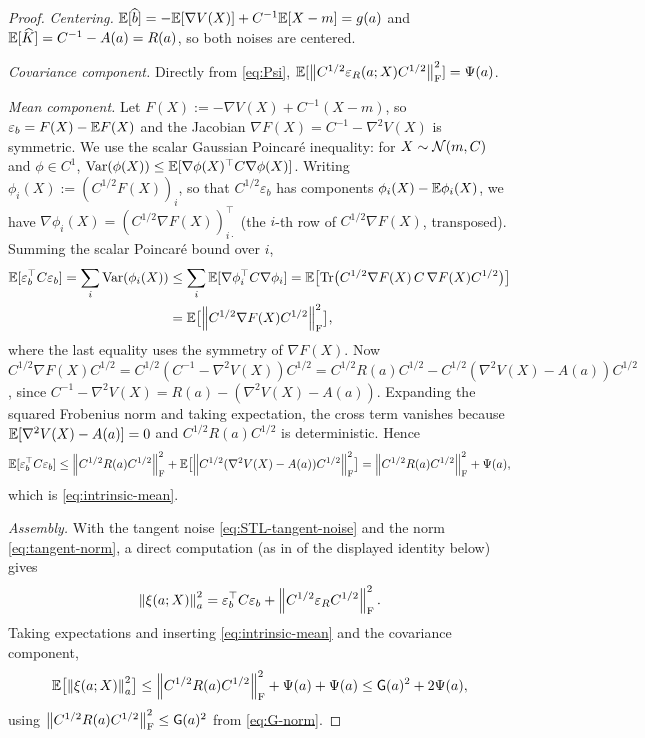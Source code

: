 \begin{proof}
\emph{Centering.} $\mathbb{E}[\widehat b]=-\mathbb{E}[\nabla V(X)]+C^{-1}\mathbb{E}[X-m]=g(a)$ and
$\mathbb{E}[\widehat K]=C^{-1}-A(a)=R(a)$, so both noises are centered.

\emph{Covariance component.} Directly from \eqref{eq:Psi},
$\mathbb{E}[\left\lVert C^{1/2}\varepsilon_R(a;X)C^{1/2}\right\rVert_{\mathrm{F}}^2]=\Psi(a)$.

\emph{Mean component.} Let $F(X):=-\nabla V(X)+C^{-1}(X-m)$, so
$\varepsilon_b=F(X)-\mathbb{E} F(X)$ and the Jacobian $\nabla F(X)=C^{-1}-\nabla^2V(X)$ is symmetric.
We use the scalar Gaussian Poincar\'e inequality: for $X\sim\mathcal{N}(m,C)$ and $\phi\in C^1$,
$\operatorname{Var}(\phi(X))\leq\mathbb{E}[\nabla\phi(X)^\top C\nabla\phi(X)]$. Writing
$\phi_i(X):=(C^{1/2}F(X))_i$, so that $C^{1/2}\varepsilon_b$ has components
$\phi_i(X)-\mathbb{E}\phi_i(X)$, we have $\nabla\phi_i(X)=(C^{1/2}\nabla F(X))_{i\cdot}^\top$ (the
$i$-th row of $C^{1/2}\nabla F(X)$, transposed). Summing the scalar Poincar\'e bound over
$i$,
\begin{align*}
    \mathbb{E}[\varepsilon_b^\top C\varepsilon_b]
    =
    \sum_i\operatorname{Var}(\phi_i(X))
    &\leq
    \sum_i\mathbb{E}[\nabla\phi_i^\top C\nabla\phi_i]
    =
    \mathbb{E}\bigl[\operatorname{Tr}\bigl(C^{1/2}\nabla F(X)\,C\,\nabla F(X)C^{1/2}\bigr)\bigr]\\
    &=
    \mathbb{E}\bigl[\left\lVert C^{1/2}\nabla F(X)C^{1/2}\right\rVert_{\mathrm{F}}^2\bigr],
\end{align*}
where the last equality uses the symmetry of $\nabla F(X)$. Now
$C^{1/2}\nabla F(X)C^{1/2}=C^{1/2}(C^{-1}-\nabla^2V(X))C^{1/2}=C^{1/2}R(a)C^{1/2}-C^{1/2}(\nabla^2V(X)-A(a))C^{1/2}$,
since $C^{-1}-\nabla^2V(X)=R(a)-(\nabla^2V(X)-A(a))$. Expanding the squared Frobenius
norm and taking expectation, the cross term vanishes because
$\mathbb{E}[\nabla^2V(X)-A(a)]=0$ and $C^{1/2}R(a)C^{1/2}$ is deterministic. Hence
\[
    \mathbb{E}[\varepsilon_b^\top C\varepsilon_b]
    \leq
    \left\lVert C^{1/2}R(a)C^{1/2}\right\rVert_{\mathrm{F}}^2
    +
    \mathbb{E}\bigl[\left\lVert C^{1/2}(\nabla^2V(X)-A(a))C^{1/2}\right\rVert_{\mathrm{F}}^2\bigr]
    =
    \left\lVert C^{1/2}R(a)C^{1/2}\right\rVert_{\mathrm{F}}^2+\Psi(a),
\]
which is \eqref{eq:intrinsic-mean}.

\emph{Assembly.} With the tangent noise \eqref{eq:STL-tangent-noise} and the norm
\eqref{eq:tangent-norm}, a direct computation (as in  of the
displayed identity below) gives
\[
    \left\lVert \xi(a;X)\right\rVert_a^2
    =
    \varepsilon_b^\top C\varepsilon_b
    +
    \left\lVert C^{1/2}\varepsilon_R C^{1/2}\right\rVert_{\mathrm{F}}^2 .
\]
Taking expectations and inserting \eqref{eq:intrinsic-mean} and the covariance component,
\[
    \mathbb{E}\bigl[\left\lVert \xi(a;X)\right\rVert_a^2\bigr]
    \leq
    \left\lVert C^{1/2}R(a)C^{1/2}\right\rVert_{\mathrm{F}}^2+\Psi(a)+\Psi(a)
    \leq
    \mathsf{G}(a)^2+2\Psi(a),
\]
using $\left\lVert C^{1/2}R(a)C^{1/2}\right\rVert_{\mathrm{F}}^2\leq\mathsf{G}(a)^2$ from \eqref{eq:G-norm}.
\end{proof}

